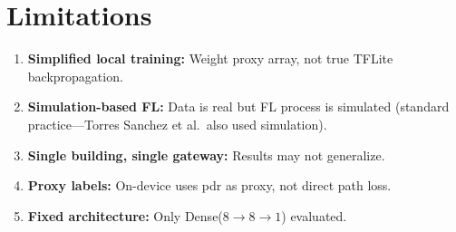\section{Limitations}
\begin{enumerate}
  \item \textbf{Simplified local training:} Weight proxy array, not true TFLite backpropagation.
  \item \textbf{Simulation-based FL:} Data is real but FL process is simulated (standard practice---Torres Sanchez et al.\ also used simulation).
  \item \textbf{Single building, single gateway:} Results may not generalize.
  \item \textbf{Proxy labels:} On-device uses \gls{pdr} as proxy, not direct path loss.
  \item \textbf{Fixed architecture:} Only Dense($8{\to}8{\to}1$) evaluated.
\end{enumerate}



